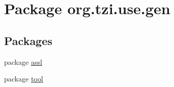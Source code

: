 \hypertarget{namespaceorg_1_1tzi_1_1use_1_1gen}{\section{Package org.\-tzi.\-use.\-gen}
\label{namespaceorg_1_1tzi_1_1use_1_1gen}
}
\subsection*{Packages}
\begin{DoxyCompactItemize}
\item 
package \hyperlink{namespaceorg_1_1tzi_1_1use_1_1gen_1_1assl}{assl}
\item 
package \hyperlink{namespaceorg_1_1tzi_1_1use_1_1gen_1_1tool}{tool}
\end{DoxyCompactItemize}

